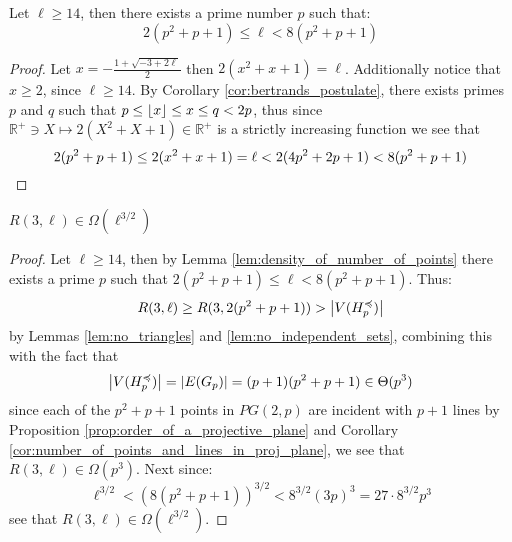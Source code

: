 \begin{lemma}\label{lem:density_of_number_of_points}
	Let $\ell \geq 14$, then there exists a prime number $p$ such that:
	\begin{equation*}
		2(p^2 + p + 1)  \leq \ell < 8(p^2 + p + 1)
	\end{equation*}
\end{lemma}
\begin{proof}
	Let $x = -\frac{1 + \sqrt{-3 + 2\ell}}{2}$ then $2(x^2 + x + 1) = \ell$. Additionally notice that $x \geq 2$, since $\ell \geq 14$. By Corollary \ref{cor:bertrands_postulate}, there exists primes $p$ and $q$ such that $p \leq \left\lfloor x\right\rfloor \leq x \leq q < 2p$, thus since $\mathbb{R}^{+} \ni X \mapsto 2(X^2 + X + 1) \in \mathbb{R}^{+}$ is a strictly increasing function we see that
	\begin{equation*}
		2(p^2 + p + 1) \leq 2(x^2 + x + 1) = \ell < 2(4p^2 + 2p + 1) < 8(p^2 + p + 1)\qedhere
	\end{equation*}
\end{proof}

\begin{theorem}
	$R(3, \ell) \in \Omega(\ell^{3 / 2})$
\end{theorem}
\begin{proof}
	Let $\ell \geq 14$, then by Lemma \ref{lem:density_of_number_of_points} there exists a prime $p$ such that $2(p^2 + p + 1) \leq \ell < 8(p^2 + p + 1)$. Thus:
	\begin{equation*}
		R(3, \ell) \geq R(3, 2(p^2 + p + 1)) > \left\lvert V(H_p^{\preccurlyeq})\right\rvert
	\end{equation*}
	by Lemmas \ref{lem:no_triangles} and \ref{lem:no_independent_sets}, combining this with the fact that
	\begin{equation*}
		\left\lvert V(H_p^{\preccurlyeq})\right\rvert = \left\lvert E(G_p)\right\rvert = (p + 1)(p^2 + p + 1) \in \Theta(p^{3})
	\end{equation*}
	since each of the $p^2 + p + 1$ points in $PG(2, p)$ are incident with $p + 1$ lines by Proposition \ref{prop:order_of_a_projective_plane} and Corollary \ref{cor:number_of_points_and_lines_in_proj_plane}, we see that $R(3, \ell) \in \Omega(p^{3})$. %
	Next since:
	\begin{equation*}
		\ell^{3 / 2} < (8(p^2 + p + 1))^{3 / 2} < 8^{3 / 2}(3p)^{3} = 27 \cdot 8^{3 / 2} p^3
	\end{equation*}
	see that $R(3, \ell) \in \Omega(\ell^{3 / 2})$.
\end{proof}
